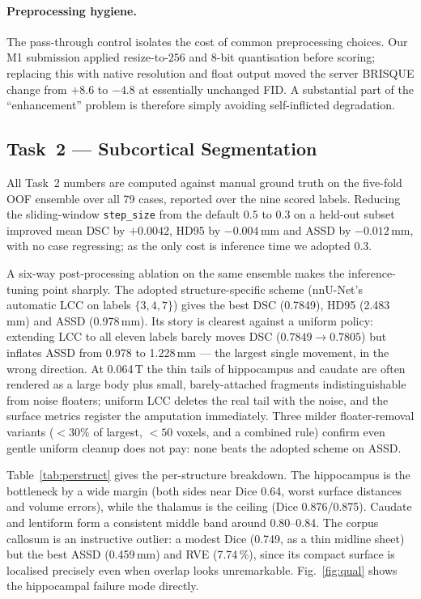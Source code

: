 \documentclass[runningheads]{llncs}
\begin{document}
\paragraph{Preprocessing hygiene.}
The pass-through control isolates the cost of common preprocessing choices. Our
M1 submission applied resize-to-$256$ and 8-bit quantisation before scoring;
replacing this with native resolution and float output moved the server BRISQUE
change from $+8.6$ to $-4.8$ at essentially unchanged FID. A substantial part of
the ``enhancement'' problem is therefore simply avoiding self-inflicted
degradation.

\subsection{Task~2 --- Subcortical Segmentation}
\label{sec:r2}

All Task~2 numbers are computed against manual ground truth on the five-fold OOF
ensemble over all 79 cases, reported over the nine scored labels. Reducing the
sliding-window \texttt{step\_size} from the default $0.5$ to $0.3$ on a held-out
subset improved mean DSC by $+0.0042$, HD95 by $-0.004$\,mm and ASSD by
$-0.012$\,mm, with no case regressing; as the only cost is inference time we
adopted $0.3$.

A six-way post-processing ablation on the same ensemble makes the inference-tuning
point sharply. The adopted structure-specific scheme (nnU-Net's automatic LCC on
labels $\{3,4,7\}$) gives the best DSC (0.7849), HD95 (2.483\,mm) and ASSD
(0.978\,mm). Its story is clearest against a uniform policy: extending LCC to all
eleven labels barely moves DSC ($0.7849\!\to\!0.7805$) but inflates ASSD from
0.978 to 1.228\,mm --- the largest single movement, in the wrong direction. At
0.064\,T the thin tails of hippocampus and caudate are often rendered as a large
body plus small, barely-attached fragments indistinguishable from noise floaters;
uniform LCC deletes the real tail with the noise, and the surface metrics register
the amputation immediately. Three milder floater-removal variants ($<30\%$ of
largest, $<50$ voxels, and a combined rule) confirm even gentle uniform cleanup
does not pay: none beats the adopted scheme on ASSD.

Table~\ref{tab:perstruct} gives the per-structure breakdown. The hippocampus is
the bottleneck by a wide margin (both sides near Dice 0.64, worst surface
distances and volume errors), while the thalamus is the ceiling (Dice
0.876/0.875). Caudate and lentiform form a consistent middle band around
0.80--0.84. The corpus callosum is an instructive outlier: a modest Dice (0.749,
as a thin midline sheet) but the best ASSD (0.459\,mm) and RVE (7.74\,\%), since
its compact surface is localised precisely even when overlap looks unremarkable.
Fig.~\ref{fig:qual} shows the hippocampal failure mode directly.
\end{document}
